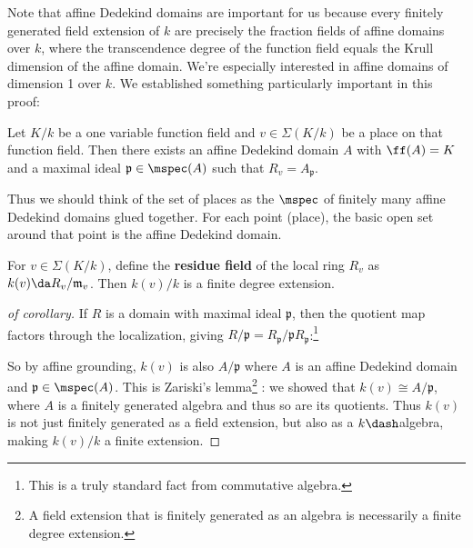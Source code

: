 \begin{remark}

Note that affine Dedekind domains are important for us because every
finitely generated field extension of \(k\) are precisely the fraction
fields of affine domains over \(k\), where the transcendence degree of
the function field equals the Krull dimension of the affine domain.
We're especially interested in affine domains of dimension 1 over \(k\).
We established something particularly important in this proof:

\end{remark}

\begin{lemma}

Let \(K/k\) be a one variable function field and \(v\in \Sigma(K/k)\) be
a place on that function field. Then there exists an affine Dedekind
domain \(A\) with \(\ff(A) = K\) and a maximal ideal
\(\mathfrak{p}\in \mspec(A)\) such that \(R_v = A_{\mathfrak{p}}\).

\end{lemma}

Thus we should think of the set of places as the \(\mspec\) of finitely
many affine Dedekind domains glued together. For each point (place), the
basic open set around that point is the affine Dedekind domain.

\begin{corollary}[?]

For \(v \in \Sigma(K/k)\), define the \textbf{residue field} of the
local ring \(R_v\) as \(k(v) \da R_v / \mathfrak{m}_v\). Then
\(k(v)/ k\) is a finite degree extension.

\end{corollary}

\begin{proof}[of corollary]

If \(R\) is a domain with maximal ideal \(\mathfrak{p}\), then the
quotient map factors through the localization, giving
\(R/\mathfrak{p} = R_{\mathfrak{p}} / \mathfrak{p} R_{\mathfrak{p}}\):\footnote{This
  is a truly standard fact from commutative algebra.}

\begin{center}\end{center}

So by affine grounding, \(k(v)\) is also \(A/\mathfrak{p}\) where \(A\)
is an affine Dedekind domain and \(\mathfrak{p}\in \mspec(A)\). This is
Zariski's lemma\footnote{A field extension that is finitely generated as
  an algebra is necessarily a finite degree extension.} : we showed that
\(k(v) \cong A/\mathfrak{p}\), where \(A\) is a finitely generated
algebra and thus so are its quotients. Thus \(k(v)\) is not just
finitely generated as a field extension, but also as a
\(k\dash\)algebra, making \(k(v)/k\) a finite extension.

\end{proof}

